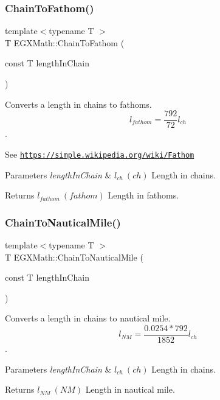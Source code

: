 \subsubsection{\texorpdfstring{Chain\+To\+Fathom()}{ChainToFathom()}}
{\footnotesize\ttfamily template$<$typename T $>$ \\
T E\+G\+X\+Math\+::\+Chain\+To\+Fathom (\begin{DoxyParamCaption}\item[{const T}]{length\+In\+Chain }\end{DoxyParamCaption})}



Converts a length in chains to fathoms. \[ l_{fathom}= \frac{792}{72} l_{ch} \]. 

See \href{https://simple.wikipedia.org/wiki/Fathom}{\tt https\+://simple.\+wikipedia.\+org/wiki/\+Fathom} 
\begin{DoxyParams}{Parameters}
{\em length\+In\+Chain} & $ l_{ch}\ (ch)$ Length in chains. \\
\hline
\end{DoxyParams}
\begin{DoxyReturn}{Returns}
$ l_{fathom}\ (fathom)$ Length in fathoms. 
\end{DoxyReturn}
\mbox{\label{group___e_g_x_math-_conversions-_length_conversions-_surveyors-_chain-_nautical_gad4c03e3aae08135e79dd4b6becc65d47}} 
\subsubsection{\texorpdfstring{Chain\+To\+Nautical\+Mile()}{ChainToNauticalMile()}}
{\footnotesize\ttfamily template$<$typename T $>$ \\
T E\+G\+X\+Math\+::\+Chain\+To\+Nautical\+Mile (\begin{DoxyParamCaption}\item[{const T}]{length\+In\+Chain }\end{DoxyParamCaption})}



Converts a length in chains to nautical mile. \[ l_{NM}= \frac{0.0254 * 792}{1852} l_{ch} \]. 


\begin{DoxyParams}{Parameters}
{\em length\+In\+Chain} & $ l_{ch}\ (ch)$ Length in chains. \\
\hline
\end{DoxyParams}
\begin{DoxyReturn}{Returns}
$ l_{NM}\ (NM)$ Length in nautical mile. 
\end{DoxyReturn}
